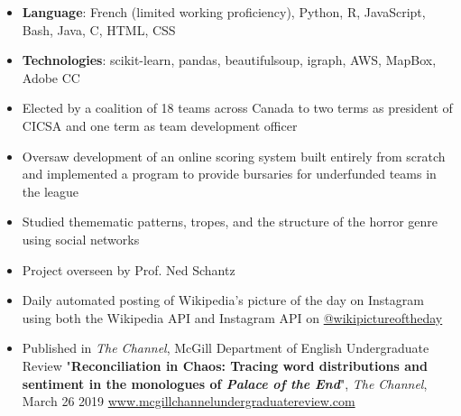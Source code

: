 \begin{itemize}
\item \textbf{Language}: French (limited working proficiency), Python, R, JavaScript, Bash, Java, C, HTML, CSS
\item \textbf{Technologies}: scikit-learn, pandas, beautifulsoup, igraph, AWS, MapBox, Adobe CC
\end{itemize}


\begin{itemize}
\item Elected by a coalition of 18 teams across Canada to two terms as president of CICSA and one term as team development officer
\item Oversaw development of an online scoring system built entirely from scratch and implemented a program to provide bursaries for underfunded teams in the league
\end{itemize}

\begin{itemize}
\item  Studied themematic patterns, tropes, and the structure of the horror genre using social networks
\item Project overseen by Prof. Ned Schantz
\end{itemize}
\begin{itemize}
\item Daily automated posting of Wikipedia's picture of the day on Instagram using both the Wikipedia API and Instagram API on \href{http://instagram.com/wikipictureoftheday}{@wikipictureoftheday}
\end{itemize}


\begin{itemize}
\item  Published in \textit{The Channel}, McGill Department of English Undergraduate Review "\textbf{Reconciliation in Chaos: Tracing word distributions and sentiment in the monologues of \textit{Palace of the End}}", \textit{The Channel}, March 26 2019 \href{http://mcgillchannelundergraduatereview.com/2019/03/reconciliation-in-chaos-tracing-word-distributions-and-sentiment-in-the-monologues-of-palace-of-the-end/}{www.mcgillchannelundergraduatereview.com}
\end{itemize}
